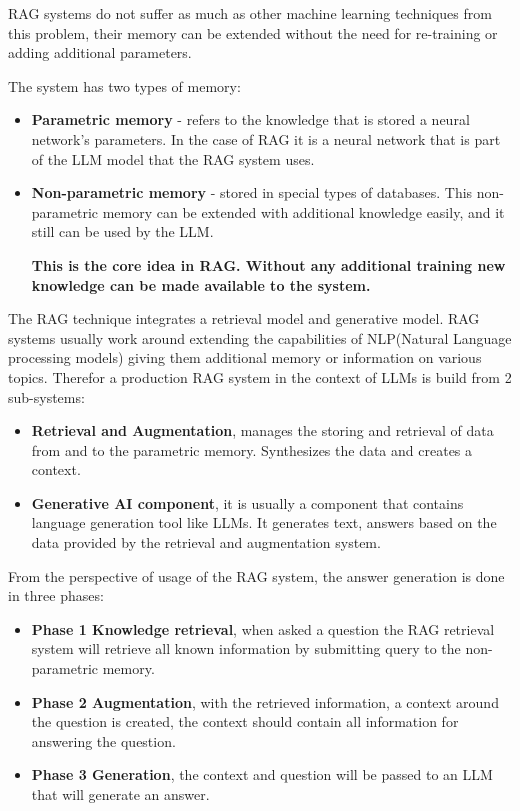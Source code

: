 \documentclass{wseas}
\begin{document}
RAG systems do not suffer as much as other machine learning techniques 
from this problem, their memory can be extended without the need for 
re-training or adding additional parameters. 

The system has two types of memory:

\begin{itemize}

\item
  \textbf{Parametric memory} - refers to the knowledge that is stored a neural network's parameters.
  In the case of RAG it is a neural network that is part of the LLM model that the RAG system uses.
\item
  \textbf{Non-parametric memory} - stored in special types of databases.
  This non-parametric memory can be extended with additional knowledge
  easily, and it still can be used by the LLM.

  \textbf{This is the core
  idea in RAG. Without any additional training new knowledge can be made
  available to the system.}
\end{itemize}

The RAG technique integrates a retrieval model and generative model. RAG
systems usually work around extending the capabilities of NLP(Natural
Language processing models) giving them additional memory or information
on various topics. Therefor a production RAG system in the context of
LLMs is build from 2 sub-systems:

\begin{itemize}

\item
  \textbf{Retrieval and Augmentation}, manages the storing and retrieval of 
  data from and to the parametric memory. Synthesizes the data and creates a context.
\item
  \textbf{Generative AI component}, it is usually a component that contains
  language generation tool like LLMs. It generates text, answers based on the data 
  provided by the retrieval and augmentation system.
\end{itemize}

From the perspective of usage of the RAG system, the answer generation is
done in three phases:

\begin{itemize}
\item
  \textbf{Phase 1 Knowledge retrieval}, when asked a question the RAG
  retrieval system will retrieve all known information by submitting query 
  to the non-parametric memory.
\item
  \textbf{Phase 2 Augmentation}, with the retrieved information, a context around
  the question is created, the context should contain all information
  for answering the question.
\item
  \textbf{Phase 3 Generation}, the context and question will be passed to an LLM
  that will generate an answer.
\end{itemize}
\end{document}
